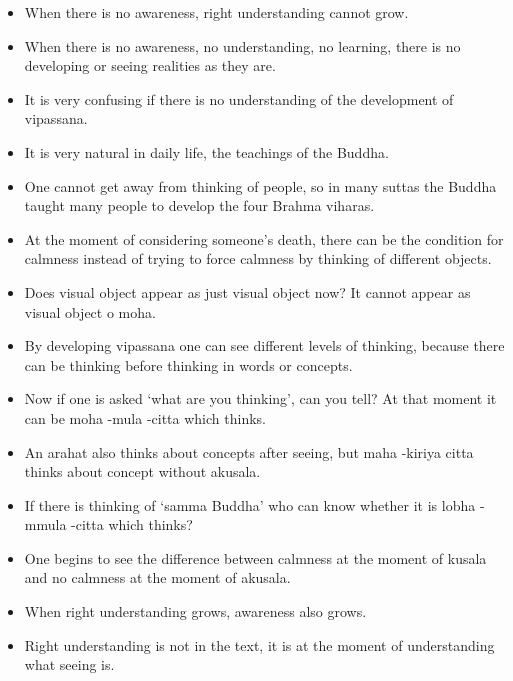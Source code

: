 \documentclass{article}
\begin{document}
\begin{itemize}
\item 
  When there is no awareness, right understanding cannot grow.

\item 
  When there is no awareness, no understanding, no learning, there is
  no developing or seeing realities as they are.

\item 
  It is very confusing if there is no understanding of the
  development of vipassana.

\item 
  It is very natural in daily life, the teachings of the Buddha.

\item 
  One cannot get away from thinking of people, so in many suttas the
  Buddha taught many people to develop the four Brahma viharas.

\item 
  At the moment of considering someone's death, there can be the
  condition for calmness instead of trying to force calmness by
  thinking of different objects.

\item 
  Does visual object appear as just visual object now? It cannot
  appear as visual object o moha.

\item 
  By developing vipassana one can see different levels of thinking,
  because there can be thinking before thinking in words or
  concepts.

\item 
  Now if one is asked `what are you thinking', can you tell? At that
  moment it can be moha -mula -citta which thinks.

\item 
  An arahat also thinks about concepts after seeing, but maha -kiriya
  citta thinks about concept without akusala.

\item 
  If there is thinking of `samma Buddha' who can know whether it is
  lobha -mmula -citta which thinks?

\item 
  One begins to see the difference between calmness at the moment of
  kusala and no calmness at the moment of akusala.

\item 
  When right understanding grows, awareness also grows.

\item 
  Right understanding is not in the text, it is at the moment of
  understanding what seeing is.


\end{itemize}
\end{document}
